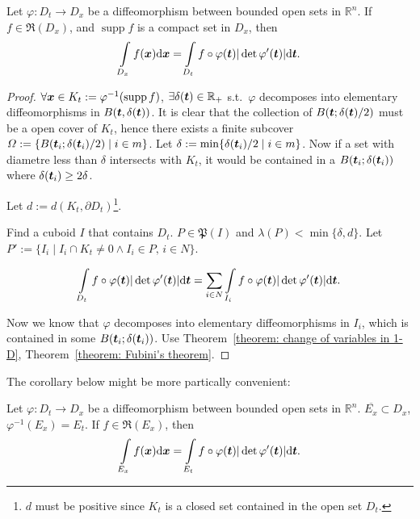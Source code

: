 \documentclass[openany]{book}
\DeclareMathOperator{\supp}{supp}
\begin{document}
\begin{theorem}
	\label{theorem: change of variables for diffeomorphism}
	Let $\varphi \colon D_t \to D_x$ be a diffeomorphism between bounded open sets in $\mathbb R^n$.
	If $f \in \mathfrak R(D_x)$, and $\supp f$ is a compact set in $D_x$, then
	\begin{equation*}
		\int\limits_{D_x} f(\boldsymbol{x}) \mathrm{d} \boldsymbol{x} = \int\limits_{D_t} f \circ \varphi(\boldsymbol{t}) |\det \varphi'(\boldsymbol{t})|\mathrm{d} \boldsymbol{t}.
	\end{equation*}
\end{theorem}
\begin{proof}
	$\forall \bv x \in K_t := \varphi^{-1}(\supp f)$, $\exists \delta(\boldsymbol{t}) \in \mathbb R_+$ s.t.\ $\varphi$ decomposes into elementary diffeomorphisms in $B(\boldsymbol{t}, \delta(\boldsymbol{t}))$. 
	It is clear that the collection of $B(\boldsymbol{t}; \delta(\boldsymbol{t})/2)$ must be a open cover of $K_t$, hence there exists a finite subcover~$\varOmega := \{ B(\boldsymbol{t}_i; \delta(\boldsymbol{t}_i)/2) \mid i \in m\}$. 
	Let $\delta := \min \{\delta(\boldsymbol{t}_i)/2 \mid i \in m\}$. 
	Now if a set with diametre less than $\delta$ intersects with $K_t$, it would be contained in a $B(\boldsymbol{t}_i; \delta(\boldsymbol{t}_i))$ where $\delta(\boldsymbol{t}_i) \geq 2 \delta$.
	
	Let $d := d(K_t, \partial D_t)$\footnote{$d$ must be positive since $K_t$ is a closed set contained in the open set $D_t$.}. 

	Find a cuboid $I$ that contains $D_t$. 
	$P \in \mathfrak P(I)$ and $\lambda(P) < \min \{\delta, d\}$. 
	Let $P' := \{I_i \mid I_i \cap K_t \neq 0 \wedge I_i \in P, \, i \in N\}$. 
	
	\begin{equation*}
		\int\limits_{D_t}  f \circ \varphi(\boldsymbol{t}) |\det \varphi'(\boldsymbol{t})|\mathrm{d} \boldsymbol{t}
			= \sum_{i \in N} \int\limits_{I_i} f \circ \varphi(\boldsymbol{t}) |\det \varphi'(\boldsymbol{t})|\mathrm{d} \boldsymbol{t}.
	\end{equation*}

	Now we know that $\varphi$ decomposes into elementary diffeomorphisms in $I_i$, which is contained in some $B(\boldsymbol{t}_i; \delta(\boldsymbol{t}_i))$. 
	Use Theorem~\ref{theorem: change of variables in 1-D}, Theorem~\ref{theorem: Fubini's theorem}.
\end{proof}

The corollary below might be more partically convenient:

\begin{corollary}
	\label{corollary: change of variables in a subset}
	Let $\varphi \colon D_t \to D_x$ be a diffeomorphism between bounded open sets in $\mathbb R^n$. 
	$\overline{E_x} \subset D_x$, $\varphi^{-1}(E_x) = E_t$. 
	If $f \in \mathfrak R(E_x)$, then
	\begin{equation*}
		\int\limits_{E_x} f(\boldsymbol{x}) \mathrm{d} \boldsymbol{x} = \int\limits_{E_t} f \circ \varphi(\boldsymbol{t}) |\det \varphi'(\boldsymbol{t})|\mathrm{d} \boldsymbol{t}.
	\end{equation*}
\end{corollary}
\end{document}
